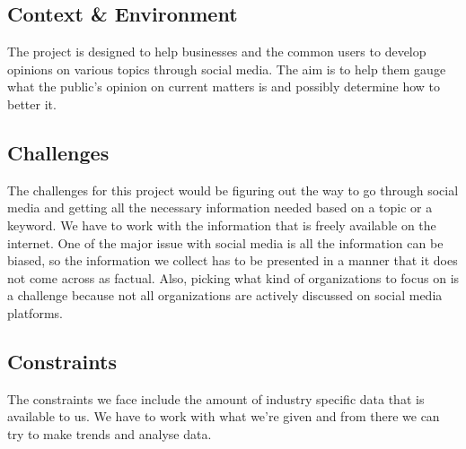 \documentclass[12pt]{article}
\begin{document}
\subsection*{Context \& Environment}
The project is designed to help businesses and the common users to develop opinions on various topics through social media. The aim is to help them gauge what the public's opinion on current matters is and possibly determine how to better it. \\

\subsection*{Challenges}
The challenges for this project would be figuring out the way to go through social media and getting all the necessary information needed based on a topic or a keyword. We have to work with the information that is freely available on the internet. One of the major issue with social media is all the information can be biased, so the information we collect has to be presented in a manner that it does not come across as factual. Also, picking what kind of organizations to focus on is a challenge because not all organizations are actively discussed on social media platforms.\\

\subsection*{Constraints}
The constraints we face include the amount of industry specific data that is available to us. We have to work with what we’re given and from there we can try to make trends and analyse data. 


 
\end{document}
